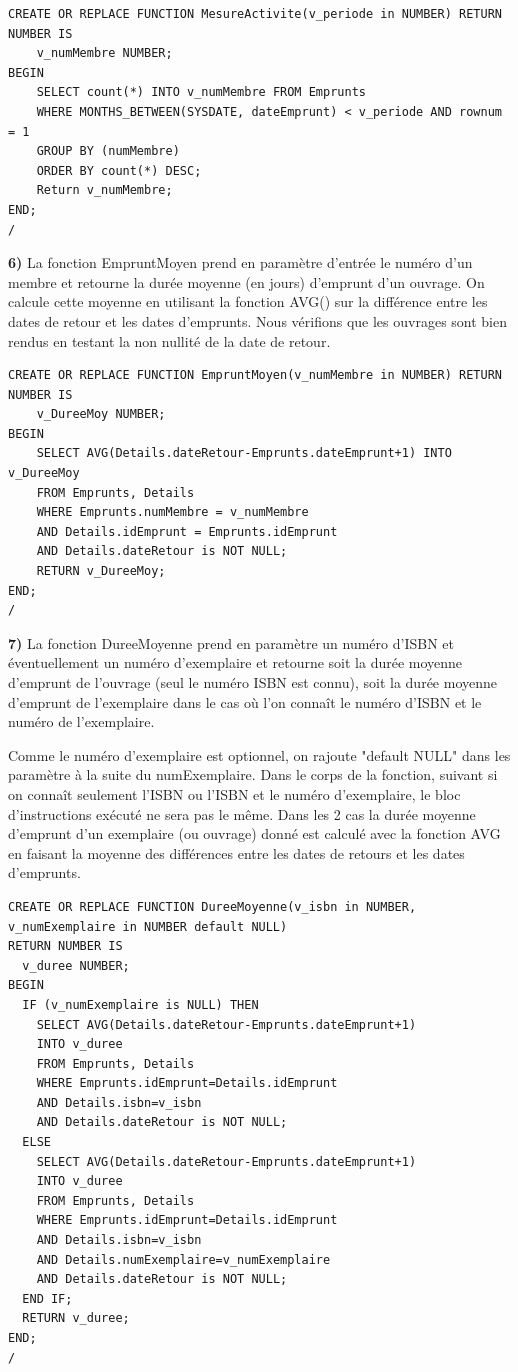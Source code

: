 \documentclass[a4paper,12pt]{article}
\begin{document}
         \begin{lstlisting}
CREATE OR REPLACE FUNCTION MesureActivite(v_periode in NUMBER) RETURN NUMBER IS 
	v_numMembre NUMBER;
BEGIN
	SELECT count(*) INTO v_numMembre FROM Emprunts 
	WHERE MONTHS_BETWEEN(SYSDATE, dateEmprunt) < v_periode AND rownum = 1 
	GROUP BY (numMembre) 
	ORDER BY count(*) DESC;
	Return v_numMembre;
END;
/
      \end{lstlisting}
         
\textbf {6)} La fonction EmpruntMoyen prend en paramètre d’entrée le numéro d’un membre et retourne la durée moyenne (en jours) d’emprunt d’un ouvrage. On calcule cette moyenne en utilisant la fonction AVG() sur la différence entre les dates de retour et les dates d'emprunts. Nous vérifions que les ouvrages sont bien rendus en testant la non nullité de la date de retour.

\begin{lstlisting}
CREATE OR REPLACE FUNCTION EmpruntMoyen(v_numMembre in NUMBER) RETURN NUMBER IS
	v_DureeMoy NUMBER;
BEGIN
	SELECT AVG(Details.dateRetour-Emprunts.dateEmprunt+1) INTO v_DureeMoy
	FROM Emprunts, Details
	WHERE Emprunts.numMembre = v_numMembre
	AND Details.idEmprunt = Emprunts.idEmprunt
	AND Details.dateRetour is NOT NULL;
	RETURN v_DureeMoy;
END;
/
\end{lstlisting}

\textbf {7)} La fonction DureeMoyenne prend en paramètre un numéro d’ISBN et éventuellement un numéro d’exemplaire et retourne soit la durée moyenne d’emprunt de l’ouvrage (seul le numéro ISBN est connu), soit la durée moyenne d’emprunt de l’exemplaire dans le cas où l’on connaît le numéro d’ISBN et le numéro de l’exemplaire.

Comme le numéro d'exemplaire est optionnel, on rajoute "default NULL" dans les paramètre à la suite du numExemplaire. Dans le corps de la fonction, suivant si on connaît seulement l'ISBN ou l'ISBN et le numéro d'exemplaire, le bloc d'instructions exécuté ne sera pas le même. Dans les 2 cas la durée moyenne d'emprunt d'un exemplaire (ou ouvrage) donné est calculé avec la fonction AVG en faisant la moyenne des différences entre les dates de retours et les dates d'emprunts.

\begin{lstlisting}
CREATE OR REPLACE FUNCTION DureeMoyenne(v_isbn in NUMBER, v_numExemplaire in NUMBER default NULL) 
RETURN NUMBER IS
  v_duree NUMBER;
BEGIN
  IF (v_numExemplaire is NULL) THEN
    SELECT AVG(Details.dateRetour-Emprunts.dateEmprunt+1)
    INTO v_duree
    FROM Emprunts, Details
    WHERE Emprunts.idEmprunt=Details.idEmprunt
    AND Details.isbn=v_isbn
    AND Details.dateRetour is NOT NULL;
  ELSE
    SELECT AVG(Details.dateRetour-Emprunts.dateEmprunt+1)
    INTO v_duree
    FROM Emprunts, Details
    WHERE Emprunts.idEmprunt=Details.idEmprunt
    AND Details.isbn=v_isbn
    AND Details.numExemplaire=v_numExemplaire
    AND Details.dateRetour is NOT NULL;
  END IF;
  RETURN v_duree;
END;
/
\end{lstlisting}
\end{document}
